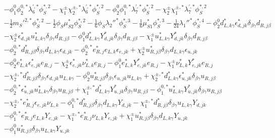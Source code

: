\begin{align}
 &- \phi_1^0 \phi_2^{0,*} \lambda^{{\prime},*}_6 \phi_{S}^{*,2} - \chi_1^\pm \chi_2^{\pm,*} \lambda^{{\prime},*}_6 \phi_{S}^{*,2} - \phi_2^0 \phi_1^{0,*} \lambda^{{\prime},*}_7 \phi_{S}^{*,2} - \chi_2^\pm \chi_1^{\pm,*} \lambda^{{\prime},*}_7 \phi_{S}^{*,2} \nonumber \\ 
 &-\frac{1}{2} {m_{S}'}^{2,*} \phi_{S}^{*,2} -\frac{1}{2} \phi_S \mu_{S2}^* \phi_{S}^{*,2} -\frac{1}{6} \phi_S \lambda_2''^* \phi_{S}^{*,3} -\frac{1}{6} \mu_{S1}^* \phi_{S}^{*,3} -\frac{1}{24} \lambda_1''^* \phi_{S}^{*,4} - \phi_2^0 d^*_{L,{k \gamma}} \epsilon^*_{d,{j k}} \delta_{\beta \gamma} d_{R,{j \beta}} \nonumber \\ 
 &- \chi_2^\pm \epsilon^*_{d,{j k}} u^*_{L,{k \gamma}} \delta_{\beta \gamma} d_{R,{j \beta}} - \phi_1^0 d^*_{L,{k \gamma}} Y^*_{d,{j k}} \delta_{\beta \gamma} d_{R,{j \beta}} - \chi_1^\pm u^*_{L,{k \gamma}} Y^*_{d,{j k}} \delta_{\beta \gamma} d_{R,{j \beta}} \nonumber \\ 
 &- \phi_2^{0,*} d^*_{R,{j \beta}} \delta_{\beta \gamma} d_{L,{k \gamma}} \epsilon_{d,{j k}} - \phi_2^{0,*} e^*_{R,{j}} e_{L,{k}} \epsilon_{e,{j k}} +\chi_2^\pm u^*_{R,{j \beta}} \delta_{\beta \gamma} d_{L,{k \gamma}} \epsilon_{u,{j k}} \nonumber \\ 
 &- \phi_2^0 e^*_{L,{k}} \epsilon^*_{e,{j k}} e_{R,{j}} - \chi_2^\pm \epsilon^*_{e,{j k}} \nu^*_{L,{k}} e_{R,{j}} - \phi_1^0 e^*_{L,{k}} Y^*_{e,{j k}} e_{R,{j}} - \chi_1^\pm \nu^*_{L,{k}} Y^*_{e,{j k}} e_{R,{j}} \nonumber \\ 
 &- \chi_2^{\pm,*} d^*_{R,{j \beta}} \delta_{\beta \gamma} \epsilon_{d,{j k}} u_{L,{k \gamma}} - \phi_2^0 u^*_{R,{j \beta}} \delta_{\beta \gamma} \epsilon_{u,{j k}} u_{L,{k \gamma}} +\chi_2^{\pm,*} d^*_{L,{k \gamma}} \epsilon^*_{u,{j k}} \delta_{\beta \gamma} u_{R,{j \beta}} \nonumber \\ 
 &- \phi_2^{0,*} \epsilon^*_{u,{j k}} u^*_{L,{k \gamma}} \delta_{\beta \gamma} u_{R,{j \beta}} +\chi_1^{\pm,*} d^*_{L,{k \gamma}} Y^*_{u,{j k}} \delta_{\beta \gamma} u_{R,{j \beta}} - \phi_1^{0,*} u^*_{L,{k \gamma}} Y^*_{u,{j k}} \delta_{\beta \gamma} u_{R,{j \beta}} \nonumber \\ 
 &- \chi_2^{\pm,*} e^*_{R,{j}} \epsilon_{e,{j k}} \nu_{L,{k}} - \phi_1^{0,*} d^*_{R,{j \beta}} \delta_{\beta \gamma} d_{L,{k \gamma}} Y_{d,{j k}} - \chi_1^{\pm,*} d^*_{R,{j \beta}} \delta_{\beta \gamma} u_{L,{k \gamma}} Y_{d,{j k}} \nonumber \\ 
 &- \phi_1^{0,*} e^*_{R,{j}} e_{L,{k}} Y_{e,{j k}} - \chi_1^{\pm,*} e^*_{R,{j}} \nu_{L,{k}} Y_{e,{j k}} +\chi_1^\pm u^*_{R,{j \beta}} \delta_{\beta \gamma} d_{L,{k \gamma}} Y_{u,{j k}} \nonumber \\ 
 &- \phi_1^0 u^*_{R,{j \beta}} \delta_{\beta \gamma} u_{L,{k \gamma}} Y_{u,{j k}} 
\end{align} 
